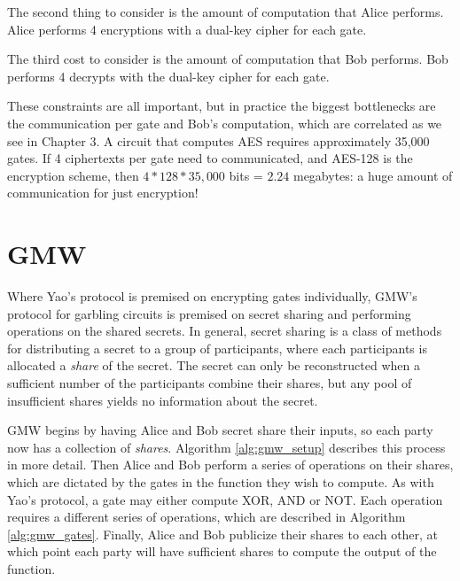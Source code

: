 The second thing to consider is the amount of computation that Alice performs.
Alice performs 4 encryptions with a dual-key cipher for each gate.

The third cost to consider is the amount of computation that Bob performs.
Bob performs 4 decrypts with the dual-key cipher for each gate.

These constraints are all important, but in practice the biggest bottlenecks are the communication per gate and Bob's computation, which are correlated as we see in Chapter 3.
A circuit that computes AES requires approximately 35,000 gates.
If 4 ciphertexts per gate need to communicated, and AES-128 is the encryption scheme, then $4 * 128 * 35,000$ bits = $2.24$ megabytes: a huge amount of communication for just encryption!

\section{GMW}
Where Yao's protocol is premised on encrypting gates individually, GMW's protocol for garbling circuits is premised on secret sharing and performing operations on the shared secrets. 
In general, secret sharing is a class of methods for distributing a secret to a group of participants, where each participants is allocated a \textit{share} of the secret. 
The secret can only be reconstructed when a sufficient number of the participants combine their shares, but any pool of insufficient shares yields no information about the secret.

GMW begins by having Alice and Bob secret share their inputs, so each party now has a collection of \textit{shares}. 
Algorithm \ref{alg:gmw_setup} describes this process in more detail.
Then Alice and Bob perform a series of operations on their shares, which are dictated by the gates in the function they wish to compute.
As with Yao's protocol, a gate may either compute XOR, AND or NOT.
Each operation requires a different series of operations, which are described in Algorithm \ref{alg:gmw_gates}.
Finally, Alice and Bob publicize their shares to each other, at which point each party will have sufficient shares to compute the output of the function.

